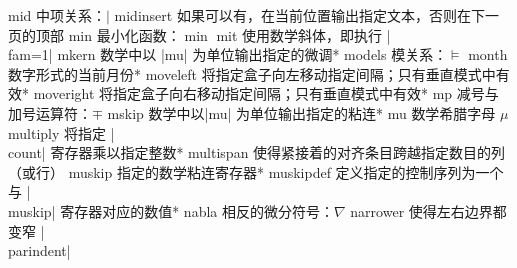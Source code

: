 \capcs mid {中项关系：$\mid$}{}{}
\capcs midinsert {如果可以有，在当前位置输出指定文本，否则在下一页的顶部}{}{}
\capcs min {最小化函数：$\min$}{}{}
\capcs mit {使用数学斜体，即执行 |\\fam=1|}{}{}
\capcs mkern {数学中以 |mu| 为单位输出指定的微调}*{}
\capcs models {模关系：$\models$}{}{}
\capcs month {数字形式的当前月份}*{}
\capcs moveleft {将指定盒子向左移动指定间隔；只有垂直模式中有效}*{}
\capcs moveright {将指定盒子向右移动指定间隔；只有垂直模式中有效}*{}
\capcs mp {减号与加号运算符：$\mp$}{}{}
\capcs mskip {数学中以|mu| 为单位输出指定的粘连}*{}
\capcs mu {数学希腊字母 $\mu$}{}{}
\capcs multiply {将指定 |\\count| 寄存器乘以指定整数}*{}
\capcs multispan {使得紧接着的对齐条目跨越指定数目的列（或行）}{}{}
\capcs muskip {指定的数学粘连寄存器}*{}
\capcs muskipdef {定义指定的控制序列为一个与 |\\muskip| 寄存器对应的数值}*{}
\capcs nabla {相反的微分符号：$\nabla$}{}{}
\capcs narrower {使得左右边界都变窄 |\\parindent|}{}{}
